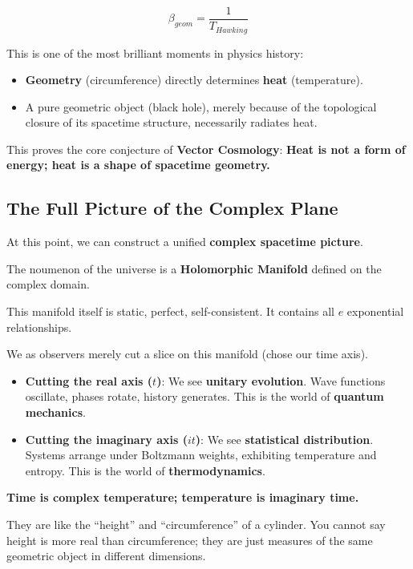 $$\beta_{geom} = \frac{1}{T_{Hawking}}$$

This is one of the most brilliant moments in physics history:

\begin{itemize}
\item \textbf{Geometry} (circumference) directly determines \textbf{heat} (temperature).

\item A pure geometric object (black hole), merely because of the topological closure of its spacetime structure, necessarily radiates heat.
\end{itemize}

This proves the core conjecture of \textbf{Vector Cosmology}: \textbf{Heat is not a form of energy; heat is a shape of spacetime geometry.}

\subsection{The Full Picture of the Complex Plane}

At this point, we can construct a unified \textbf{complex spacetime picture}.

The noumenon of the universe is a \textbf{Holomorphic Manifold} defined on the complex domain.

This manifold itself is static, perfect, self-consistent. It contains all $e$ exponential relationships.

We as observers merely cut a slice on this manifold (chose our time axis).

\begin{itemize}
\item \textbf{Cutting the real axis ($t$)}: We see \textbf{unitary evolution}. Wave functions oscillate, phases rotate, history generates. This is the world of \textbf{quantum mechanics}.

\item \textbf{Cutting the imaginary axis ($it$)}: We see \textbf{statistical distribution}. Systems arrange under Boltzmann weights, exhibiting temperature and entropy. This is the world of \textbf{thermodynamics}.
\end{itemize}

\textbf{Time is complex temperature; temperature is imaginary time.}

They are like the ``height'' and ``circumference'' of a cylinder. You cannot say height is more real than circumference; they are just measures of the same geometric object in different dimensions.

